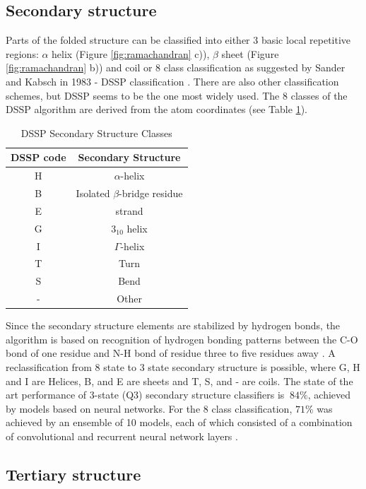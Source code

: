\subsection{Secondary structure}

Parts of the folded structure can be classified into either 3 basic local repetitive regions: $\alpha$ helix (Figure \ref{fig:ramachandran} c)), $\beta$ sheet (Figure \ref{fig:ramachandran} b)) and coil or 8 class classification as suggested by Sander and Kabsch in 1983 - DSSP classification \cite{dssp2}. 
There are also other classification schemes, but DSSP seems to be the one most widely used. 
The 8 classes of the DSSP algorithm are derived from the atom coordinates (see Table \ref{tab:dssp0}).

\begin{table}[ht]
    \centering
    \begin{tabular}{c|c}
        DSSP code & Secondary Structure\\ 
        \hline
        H     & $\alpha$-helix \\
        B     & Isolated $\beta$-bridge residue \\
        E     & strand \\
        G     & $3_{10}$ helix \\
        I     & $\Gamma$-helix \\
        T     & Turn \\
        S     & Bend \\
        -     & Other 
    \end{tabular}
    \caption{DSSP Secondary Structure Classes}
    \label{tab:dssp0}
\end{table}

Since the secondary structure elements are stabilized by hydrogen bonds, the algorithm is based on recognition of hydrogen bonding patterns between the C-O bond of one residue and N-H bond of residue three to five residues away \cite{dssp2}. 
A reclassification from 8 state to 3 state secondary structure is possible, where G, H and I are Helices, B, and E are sheets and T, S, and - are coils. 
The state of the art performance of 3-state (Q3) secondary structure classifiers is $~84\%$, achieved by models based on neural networks. 
For the 8 class classification, $71\%$ was achieved by an ensemble of 10 models, each of which consisted of a combination of convolutional and recurrent neural network layers \cite{dssp_sec}. 

\subsection{Tertiary structure}

